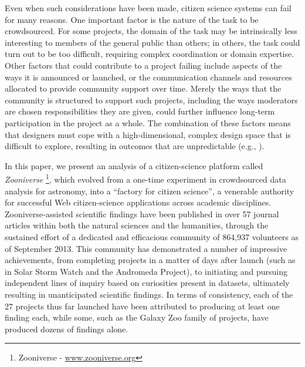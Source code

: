 \documentclass{sigchi}
\begin{document}



Even when such considerations have been made, citizen science systems can fail for many reasons. One important factor is the nature of the task to be crowdsourced. For some projects, the domain of the task may be intrinsically less interesting to members of the general public than others; in others, the task could turn out to be too difficult, requiring complex coordination or domain expertise. Other factors that could contribute to a project failing include aspects of the ways it is announced or launched, or the communication channels and resources allocated to provide community support over time.  Merely the ways that the community is structured to support such projects, including the ways moderators are chosen responsibilities they are given, could further influence long-term participation in the project as a whole. The combination of these factors means that designers must cope with a high-dimensional, complex design space that is difficult to explore, resulting in outcomes that are unpredictable (e.g., \cite{ebird, ubiome, druschke2012failures}).

In this paper, we present an analysis of a citizen-science platform called \emph{Zooniverse} \footnote{Zooniverse - \url{www.zooniverse.org}}, which evolved from a one-time experiment in crowdsourced data analysis for astronomy, into a ``factory for citizen science'', a venerable authority for successful Web citizen-science applications across academic disciplines. Zooniverse-assisted scientific findings have been published in over 57 journal articles within both the natural sciences and the humanities, through the sustained effort of a dedicated and efficacious community of 864,937 volunteers as of September 2013.  This community has demonstrated a number of impressive achievements, from completing projects in a matter of days after launch (such as in Solar Storm Watch and the Andromeda Project), to initiating and pursuing independent lines of inquiry based on curiosities present in datasets, ultimately resulting in unanticipated scientific findings.  In terms of consistency, each of the 27 projects thus far launched have been attributed to producing at least one finding each, while some, such as the Galaxy Zoo family of projects, have produced dozens of findings alone.
\end{document}
